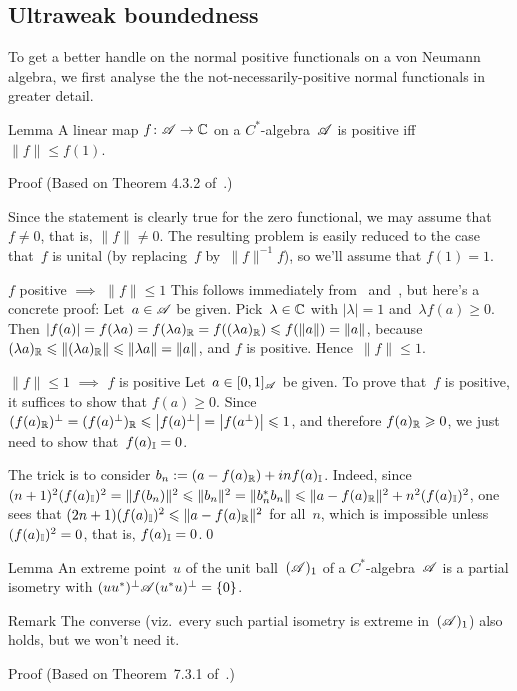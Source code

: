 \documentclass[a]{subfiles}
\begin{document}
\subsection{Ultraweak boundedness}
\begin{parsec}%
\begin{point}%
To get a better handle on the normal positive functionals
on a von Neumann algebra,
we first analyse the the not-necessarily-positive normal functionals
in greater detail.
\end{point}
\begin{point}{Lemma}%
A linear map $f\colon \mathscr{A}\to \mathbb{C}$
on a $C^*$-algebra~$\mathscr{A}$
is positive iff $\|f\|\leq f(1)$.
\begin{point}{Proof}%
(Based on Theorem 4.3.2 of~\cite{kr}.)

Since the statement is clearly true for the zero functional,
we may assume that~$f\neq 0$, that is, $\|f\|\neq 0$.
The resulting
problem is  easily reduced
to the case that~$f$ is unital
(by replacing~$f$ by~$\|f\|^{-1}f $), so we'll assume that $f(1)=1$.

\begin{point}{$f$ positive $\implies$ $\|f\|\leq 1$}%
This follows
immediately from~ and~,
but here's a concrete proof:
Let~$a\in \mathscr{A}$ be given.
Pick~$\lambda\in \mathbb{C}$ with $\left|\lambda\right|=1$
and~$\lambda f(a)\geq 0$.
Then $\left|f(a)\right|=f(\lambda a) 
= f(\lambda a)_{\mathbb{R}}
= f((\lambda a)_{\mathbb{R}})
\leqslant f(\|a\|)=\|a\|$,
because $(\lambda a)_{\mathbb{R}}
\leqslant \|(\lambda a)_{\mathbb{R}}\|
\leqslant \|\lambda a\|=\|a\|$,
and $f$ is positive.
Hence~$\|f\|\leq 1$.
\end{point}
\begin{point}{$\|f\|\leq 1$ $\implies$ $f$ is positive}%
Let~$a\in [0,1]_{\mathscr{A}}$ be given.
To prove that~$f$ is positive, it suffices to show that $f(a)\geq 0$.
Since $(f(a)_{\mathbb{R}})^\perp
=(f(a)^\perp)_{\mathbb{R}}
\leqslant \left|f(a)^\perp \right|
=\left|f(a^\perp)\right|\leqslant 1$,
and therefore $f(a)_{\mathbb{R}}\geqslant 0$,
we just need to show that~$f(a)_{\mathbb{I}}=0$.

The trick is to consider $b_n := (a - f(a)_{\mathbb{R}})+inf(a)_{\mathbb{I}}$.
Indeed, since $(n+1)^2(f(a)_{\mathbb{I}})^2
= \|f(b_n)\|^2 \leqslant \|b_n\|^2 = 
\|b_n^*b_n\| \leqslant \|a-f(a)_{\mathbb{R}}\|^2 + n^2(f(a)_{\mathbb{I}})^2$,
one sees that $(2n+1)(f(a)_{\mathbb{I}})^2\leqslant \|a-f(a)_{\mathbb{R}}\|^2$
for all~$n$,
which is impossible unless~$(f(a)_{\mathbb{I}})^2=0$,
that is, $f(a)_{\mathbb{I}}=0$.\qed
\end{point}
\end{point}
\end{point}
\begin{point}{Lemma}%
An extreme point~$u$ of the unit ball~$(\mathscr{A})_1$
of a $C^*$-algebra~$\mathscr{A}$
is a partial isometry with $(uu^*)^\perp\mathscr{A}(u^*u)^\perp = \{0\}$.
\begin{point}{Remark}%
The converse (viz.~every such partial isometry
is extreme in~$(\mathscr{A})_1$)
also holds, but we won't need it.
\end{point}
\begin{point}{Proof}%
(Based on Theorem~7.3.1 of~\cite{kr}.)


\end{point}
\end{point}
\end{parsec}
\end{document}
